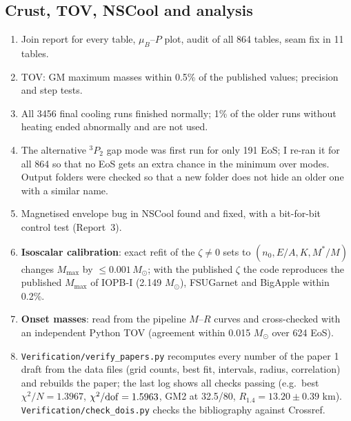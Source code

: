 \documentclass[11pt,a4paper]{article}
\newcommand{\Msun}{M_\odot}
\begin{document}
\subsection{Crust, TOV, NSCool and analysis}
\begin{enumerate}
\item Join report for every table, $\mu_B$--$P$ plot, audit of all 864 tables, seam fix in 11 tables.
\item TOV: GM maximum masses within 0.5\% of the published values; precision and step tests.
\item All 3456 final cooling runs finished normally; 1\% of the older runs without heating ended abnormally and are not used.
\item The alternative $^3P_2$ gap mode was first run for only 191 EoS; I re-ran it for all 864 so that no EoS gets an extra chance in the minimum over modes. Output folders were checked so that a new folder does not hide an older one with a similar name.
\item Magnetised envelope bug in NSCool found and fixed, with a bit-for-bit control test (Report~3).
\item \textbf{Isoscalar calibration}: exact refit of the $\zeta\neq0$ sets to $(n_0,E/A,K,M^*/M)$ changes $M_{\max}$ by $\le0.001\,\Msun$; with the published $\zeta$ the code reproduces the published $M_{\max}$ of IOPB-I (2.149 $\Msun$), FSUGarnet and BigApple within 0.2\%.
\item \textbf{Onset masses}: read from the pipeline $M$--$R$ curves and cross-checked with an independent Python TOV (agreement within 0.015 $\Msun$ over 624 EoS).
\item \texttt{Verification/verify\_papers.py} recomputes every number of the paper 1 draft from the data files (grid counts, best fit, intervals, radius, correlation) and rebuilds the paper; the last log shows all checks passing (e.g.\ best $\chi^2/N=1.3967$, $\chi^2/{\rm dof}=1.5963$, GM2 at 32.5/80, $R_{1.4}=13.20\pm0.39$ km). \texttt{Verification/check\_dois.py} checks the bibliography against Crossref.
\end{enumerate}
\end{document}
